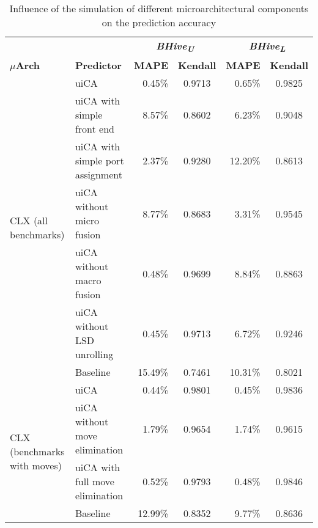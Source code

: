 \documentclass[sigconf,nonacm]{acmart}
\newcommand{\bhivel}{\emph{BHive\textsubscript{L}}\xspace}
\newcommand{\bhiveu}{\emph{BHive\textsubscript{U}}\xspace}
\newcommand{\uiCA}{uiCA\xspace}
\begin{document}
\begin{table*}
\caption{Influence of the simulation of different microarchitectural components on the prediction accuracy}
\begin{tabular}{llrcrc}
\toprule
& & \multicolumn{2}{c}{\textbf{\bhiveu}} & \multicolumn{2}{c}{\textbf{\bhivel}}\\  \cmidrule(lr){3-4}\cmidrule(lr){5-6}
\textbf{{$\mu$}Arch} & \textbf{Predictor} & \textbf{MAPE} & \textbf{Kendall} & \textbf{MAPE} & \textbf{Kendall}\\
\midrule
\multirow{7}{*}{CLX (all benchmarks)} & \uiCA & 0.45\% & 0.9713 & 0.65\% & 0.9825 \\
                      & \uiCA with simple front end & 8.57\% & 0.8602 & 6.23\% & 0.9048\\
                      & \uiCA with simple port assignment & 2.37\% & 0.9280 & 12.20\% & 0.8613\\
                      & \uiCA without micro fusion & 8.77\% & 0.8683 & 3.31\% & 0.9545\\
                      & \uiCA without macro fusion & 0.48\% & 0.9699 & 8.84\% & 0.8863\\
                      & \uiCA without LSD unrolling & 0.45\% & 0.9713 & 6.72\% & 0.9246\\
                      & Baseline & 15.49\% & 0.7461 & 10.31\% & 0.8021\\
\midrule
\multirow{4}{*}{CLX (benchmarks with moves)} & \uiCA & 0.44\% & 0.9801 & 0.45\% & 0.9836 \\
                      & \uiCA without move elimination & 1.79\% & 0.9654 & 1.74\% & 0.9615\\
                      & \uiCA with full move elimination & 0.52\% & 0.9793 & 0.48\% & 0.9846\\
                      & Baseline & 12.99\% & 0.8352 & 9.77\% & 0.8636\\
\bottomrule
\end{tabular}
\end{table*}

\clearpage
\appendix
\end{document}
